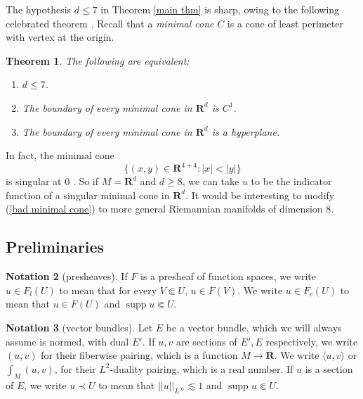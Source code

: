 \documentclass[reqno,12pt,letterpaper]{amsart}
\newcommand{\RR}{\mathbf{R}}
\DeclareMathOperator{\supp}{supp}
\newcommand{\dfn}[1]{\emph{#1}\index{#1}}
\newtheorem{theorem}{Theorem}[section]
\theoremstyle{definition}
\newtheorem{notation}[theorem]{Notation}
\numberwithin{equation}{section}
\begin{document}
The hypothesis $d \leq 7$ in Theorem \ref{main thm} is sharp, owing to the following celebrated theorem \cite[Theorem 6.2.2]{Simons68} \cite[Theorem A]{BOMBIERI1969}.
Recall that a \dfn{minimal cone} $C$ is a cone of least perimeter with vertex at the origin.

\begin{theorem}\label{minimal cones in R8}
The following are equivalent:
\begin{enumerate}
\item $d \leq 7$.
\item The boundary of every minimal cone in $\RR^d$ is $C^1$.
\item The boundary of every minimal cone in $\RR^d$ is a hyperplane.
\end{enumerate}
\end{theorem}

In fact, the minimal cone
\begin{equation}\label{bad minimal cone}
\{(x, y) \in \RR^{4 + 4}: |x| < |y|\}
\end{equation}
is singular at $0$ \cite[Theorem A]{BOMBIERI1969}.
So if $M = \RR^d$ and $d \geq 8$, we can take $u$ to be the indicator function of a singular minimal cone in $\RR^d$.
It would be interesting to modify (\ref{bad minimal cone}) to more general Riemannian manifolds of dimension $8$.



\subsection{Preliminaries}
\begin{notation}[presheaves]
If $F$ is a presheaf of function spaces, we write $u \in F_l(U)$ to mean that for every $V \Subset U$, $u \in F(V)$.
We write $u \in F_c(U)$ to mean that $u \in F(U)$ and $\supp u \Subset U$.
\end{notation}

\begin{notation}[vector bundles]
Let $E$ be a vector bundle, which we will always assume is normed, with dual $E'$.
If $u,v$ are sections of $E',E$ respectively, we write $(u, v)$ for their fiberwise pairing, which is a function $M \to \RR$.
We write $\langle u, v\rangle$ or $\int_M (u, v)$, for their $L^2$-duality pairing, which is a real number.
If $u$ is a section of $E$, we write $u \prec U$ to mean that $||u||_{L^\infty} \lesssim 1$ and $\supp u \Subset U$.
\end{notation}
\end{document}

